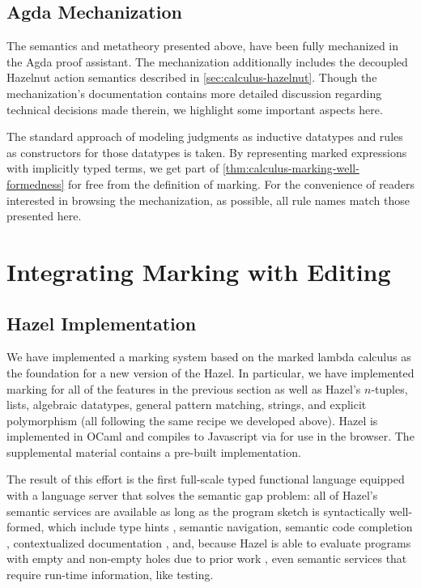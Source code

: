 \subsection{Agda Mechanization}
\label{sec:calculus-agda}

The semantics and metatheory presented above, have
been fully mechanized in the Agda proof assistant. The mechanization additionally includes the decoupled Hazelnut action semantics described in \cref{sec:calculus-hazelnut}. Though the mechanization's documentation contains
more detailed discussion regarding technical decisions made therein, we highlight some important
aspects here.

The standard approach of modeling judgments as inductive datatypes and rules as constructors for
those datatypes is taken. By representing marked expressions with implicitly typed terms,
we get part of \cref{thm:calculus-marking-well-formedness} for free from the definition of marking. For the convenience of
readers interested in browsing the mechanization, as possible, all rule names match those presented here.




\section{Integrating Marking with Editing}
\label{sec:calculus-structured-editing}
\subsection{Hazel Implementation}
\label{sec:calculus-hazel}

We have implemented a marking system based on the marked lambda calculus as the foundation for a new version of the Hazel. %
In particular, we have implemented marking for all of the features in the previous section as well as Hazel's $n$-tuples, lists, algebraic datatypes, general pattern matching, strings, and explicit polymorphism (all following the same recipe we developed above).
Hazel is implemented in OCaml and compiles to Javascript via  \cite{jsoo} for use in the browser.
The supplemental material contains a pre-built implementation.

The result of this effort is the first full-scale typed functional language equipped with a language server that solves the semantic gap problem: all of Hazel's semantic services are available as long as the program sketch is syntactically well-formed, which include type hints \cite{potter2020hazel}, semantic navigation, semantic code completion \cite{potter2020hazel,blinn2022integrative}, contextualized documentation \cite{potter2022contextualized}, and, because Hazel is able to evaluate programs with empty and non-empty holes due to prior work \cite{HazelLive}, even semantic services that require run-time information, like testing.
% 

